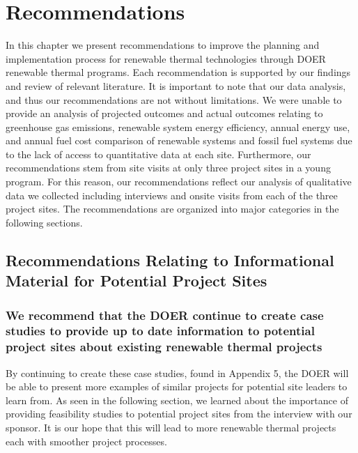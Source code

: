 
\chapter{Recommendations}
\par In this chapter we present recommendations to improve the planning and implementation process for renewable thermal technologies through DOER renewable thermal programs. Each recommendation is supported by our findings and review of relevant literature. It is important to note that our data analysis, and thus our recommendations are not without limitations. We were unable to provide an analysis of projected outcomes and actual outcomes relating to greenhouse gas emissions, renewable system energy efficiency, annual energy use, and annual fuel cost comparison of renewable systems and fossil fuel systems due to the lack of access to quantitative data at each site. Furthermore, our recommendations stem from site visits at only three project sites in a young program. For this reason, our recommendations reflect our analysis of qualitative data we collected including interviews and onsite visits from each of the three project sites. The recommendations are organized into major categories in the following sections.

\section{Recommendations Relating to Informational Material for Potential Project Sites}
\subsection{We recommend that the DOER continue to create case studies to provide up to date information to potential project sites about existing renewable thermal projects}  
\par By continuing to create these case studies, found in Appendix 5, the DOER will be able to present more examples of similar projects for potential site leaders to learn from. As seen in the following section, we learned about the importance of providing feasibility studies to potential project sites from the interview with our sponsor. It is our hope that this will lead to more renewable thermal projects each with smoother project processes.

